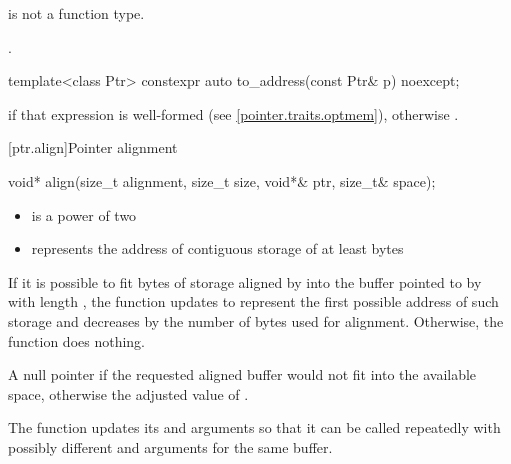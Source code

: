 \begin{itemdescr}
\pnum
\mandates
{} is not a function type.

\pnum
\returns
{}.
\end{itemdescr}

%
\begin{itemdecl}
template<class Ptr> constexpr auto to_address(const Ptr& p) noexcept;
\end{itemdecl}

\begin{itemdescr}
\pnum
\returns
{} if that expression is well-formed
(see \ref{pointer.traits.optmem}),
otherwise .
\end{itemdescr}

[ptr.align]{Pointer alignment}

%
\begin{itemdecl}
void* align(size_t alignment, size_t size, void*& ptr, size_t& space);
\end{itemdecl}

\begin{itemdescr}
\pnum
\expects
\begin{itemize}
\item
{} is a power of two

\item
{} represents the address of contiguous storage of at least
 bytes
\end{itemize}

\pnum
\effects
If it is possible to fit  bytes
of storage aligned by  into the buffer pointed to by
 with length , the function updates
 to represent the first possible address of such storage
and decreases  by the number of bytes used for alignment.
Otherwise, the function does nothing.

\pnum
\returns
A null pointer if the requested aligned buffer
would not fit into the available space, otherwise the adjusted value
of .

\pnum
\begin{note}
The function updates its 
and  arguments so that it can be called repeatedly
with possibly different  and 
arguments for the same buffer.
\end{note}
\end{itemdescr}

